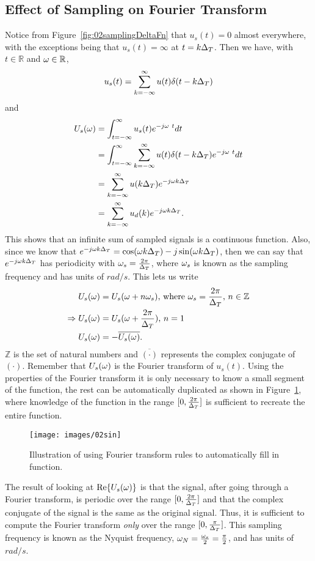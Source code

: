 \subsection{Effect of Sampling on Fourier Transform}
Notice from Figure~\ref{fig:02samplingDeltaFn} that $u_s(t) = 0$ almost everywhere, with the exceptions being that $u_s(t) = \infty$ at $t=k\Delta_T$.
Then we have, with $t\in\mathbb{R}$ and $\omega\in\mathbb{R}$,
$$u_s(t) = \sum_{k=-\infty}^\infty u(t)\delta(t-k\Delta_T)$$
and
\begin{align*}
U_s(\omega) &= \int_{t=-\infty}^\infty u_s(t)e^{-j\omega\ t} dt \\
&= \int_{t=-\infty}^\infty \sum_{k=-\infty}^\infty u(t)\delta(t-k\Delta_T)e^{-j\omega\ t} dt \\
&= \sum_{k=-\infty}^\infty u(k\Delta_T) e^{-j\omega k\Delta_T} \\
&= \sum_{k=-\infty}^\infty u_d(k) e^{-j\omega k\Delta_T}.
\end{align*}
This shows that an infinite sum of sampled signals is a continuous function.
Also, since we know that $e^{-j\omega k\Delta_T} = \cos(\omega k\Delta_T) - j\sin(\omega k\Delta_T)$, then we can say that $e^{-j\omega k\Delta_T}$ has periodicity with $\omega_s = \frac{2\pi}{\Delta_T}$, where $\omega_s$ is known as the sampling frequency and has units of $rad/s$.
This lets us write
\begin{align*}
U_s(\omega) &= U_s(\omega+n\omega_s) \text{, where } \omega_s = \frac{2\pi}{\Delta_T} \text{, } n\in\mathbb{Z} \\
\Rightarrow U_s(\omega) &= U_s(\omega+\frac{2\pi}{\Delta_T}) \text{, } n=1 \\
U_s(\omega) &= -\overline{U_s(\omega)}.
\end{align*}
$\mathbb{Z}$ is the set of natural numbers and $\overline{(\cdot)}$ represents the complex conjugate of $(\cdot)$.
Remember that $U_s(\omega)$ is the Fourier transform of $u_s(t)$.
Using the properties of the Fourier transform it is only necessary to know a small segment of the function, the rest can be automatically duplicated as shown in Figure~\ref{fig:02sin}, where knowledge of the function in the range $[0,\frac{2\pi}{\Delta_T}]$ is sufficient to recreate the entire function.
\begin{figure}[ht!]
\centering
\texttt{[image: images/02sin]}
\caption{Illustration of using Fourier transform rules to automatically fill in function.}
\label{fig:02sin}
\end{figure}

The result of looking at $\text{Re}\{U_s(\omega)\}$ is that the signal, after going through a Fourier transform, is periodic over the range $[0, \frac{2\pi}{\Delta_T}]$ and that the complex conjugate of the signal is the same as the original signal.
Thus, it is sufficient to compute the Fourier transform \textit{only} over the range $[0, \frac{\pi}{\Delta_T}]$.
This sampling frequency is known as the Nyquist frequency, $\omega_N = \frac{\omega_s}{2} = \frac{\pi}{2}$, and has units of $rad/s$.

